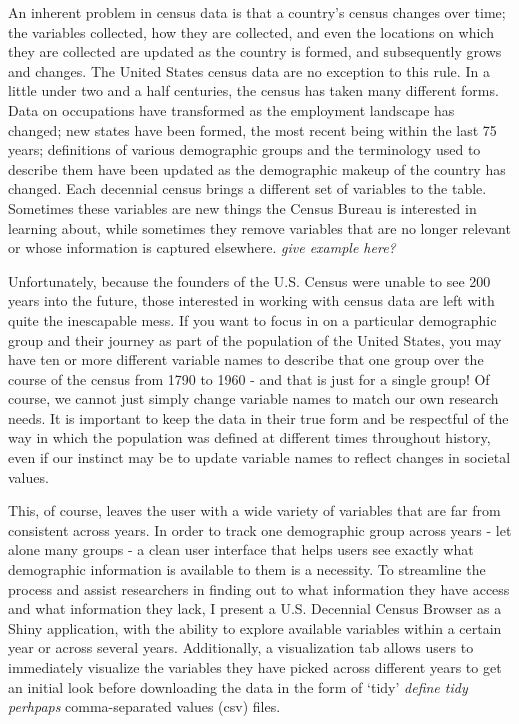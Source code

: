 \documentclass[DIV=calc, paper=a4, fontsize=10pt, twocolumn]{scrartcl}\usepackage[]{graphicx}\usepackage[]{color}
\begin{document}
\par An inherent problem in census data is that a country's census changes over time; the variables collected, how they are collected, and even the locations on which they are collected are updated as the country is formed, and subsequently grows and changes. The United States census data are no exception to this rule. In a little under two and a half centuries, the census has taken many different forms. Data on occupations have transformed as the employment landscape has changed; new states have been formed, the most recent being within the last 75 years; definitions of various demographic groups and the terminology used to describe them have been updated as the demographic makeup of the country has changed. Each decennial census brings a different set of variables to the table. Sometimes these variables are new things the Census Bureau is interested in learning about, while sometimes they remove variables that are no longer relevant or whose information is captured elsewhere. \textit{give example here?}

\par Unfortunately, because the founders of the U.S. Census were unable to see 200 years into the future, those interested in working with census data are left with quite the inescapable mess. If you want to focus in on a particular demographic group and their journey as part of the population of the United States, you may have ten or more different variable names to describe that one group over the course of the census from 1790 to 1960 - and that is just for a single group! Of course, we cannot just simply change variable names to match our own research needs. It is important to keep the data in their true form and be respectful of the way in which the population was defined at different times throughout history, even if our instinct may be to update variable names to reflect changes in societal values.  

\par This, of course, leaves the user with a wide variety of variables that are far from consistent across years. In order to track one demographic group across years - let alone many groups - a clean user interface that helps users see exactly what demographic information is available to them is a necessity. To streamline the process and assist researchers in finding out to what information they have access and what information they lack, I present a U.S. Decennial Census Browser as a Shiny application, with the ability to explore available variables within a certain year or across several years. Additionally, a visualization tab allows users to immediately visualize the variables they have picked across different years to get an initial look before downloading the data in the form of `tidy' \textit{define tidy perhpaps} comma-separated values (csv) files.  
\end{document}
